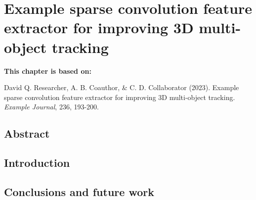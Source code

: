 \chapter[Example sparse convolution feature extractor for improving 3D multi-object tracking]{Example sparse convolution feature extractor for improving 3D multi-object tracking}
\label{cha:chapter3}
\vspace*{\fill}
\textbf{This chapter is based on:}

David Q. Researcher, A. B. Coauthor, \& C. D. Collaborator (2023). Example sparse convolution feature extractor for improving 3D multi-object tracking. \textit{Example Journal}, 236, 193-200.
\newpage

\section*{Abstract}
\lipsum[1]

\newpage

\section{Introduction}

\lipsum[1-3]

\section{Conclusions and future work} 
\lipsum[4]